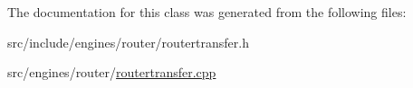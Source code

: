 The documentation for this class was generated from the following files\+:\begin{DoxyCompactItemize}
\item 
src/include/engines/router/routertransfer.\+h\item 
src/engines/router/\mbox{\hyperlink{routertransfer_8cpp}{routertransfer.\+cpp}}\end{DoxyCompactItemize}
